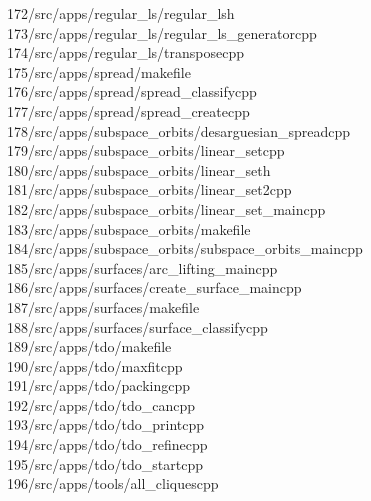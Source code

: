 \begin{tabbing}
172\>/src/apps/regular\_ls/regular\_lsh\\[0pt]
173\>/src/apps/regular\_ls/regular\_ls\_generatorcpp\\[0pt]
174\>/src/apps/regular\_ls/transposecpp\\[0pt]
175\>/src/apps/spread/makefile\\[0pt]
176\>/src/apps/spread/spread\_classifycpp\\[0pt]
177\>/src/apps/spread/spread\_createcpp\\[0pt]
178\>/src/apps/subspace\_orbits/desarguesian\_spreadcpp\\[0pt]
179\>/src/apps/subspace\_orbits/linear\_setcpp\\[0pt]
180\>/src/apps/subspace\_orbits/linear\_seth\\[0pt]
181\>/src/apps/subspace\_orbits/linear\_set2cpp\\[0pt]
182\>/src/apps/subspace\_orbits/linear\_set\_maincpp\\[0pt]
183\>/src/apps/subspace\_orbits/makefile\\[0pt]
184\>/src/apps/subspace\_orbits/subspace\_orbits\_maincpp\\[0pt]
185\>/src/apps/surfaces/arc\_lifting\_maincpp\\[0pt]
186\>/src/apps/surfaces/create\_surface\_maincpp\\[0pt]
187\>/src/apps/surfaces/makefile\\[0pt]
188\>/src/apps/surfaces/surface\_classifycpp\\[0pt]
189\>/src/apps/tdo/makefile\\[0pt]
190\>/src/apps/tdo/maxfitcpp\\[0pt]
191\>/src/apps/tdo/packingcpp\\[0pt]
192\>/src/apps/tdo/tdo\_cancpp\\[0pt]
193\>/src/apps/tdo/tdo\_printcpp\\[0pt]
194\>/src/apps/tdo/tdo\_refinecpp\\[0pt]
195\>/src/apps/tdo/tdo\_startcpp\\[0pt]
196\>/src/apps/tools/all\_cliquescpp\\[0pt]

\end{tabbing}
